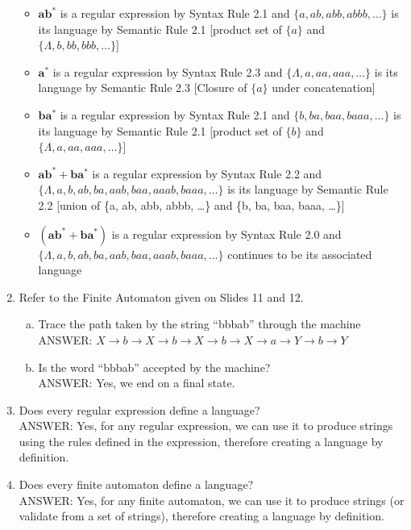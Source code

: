 \documentclass{article}
\begin{document}
\begin{enumerate}[1.]
\begin{itemize}
            \item $\bm{ab^*}$ is a regular expression by Syntax Rule 2.1 and
                $\{a, ab, abb, abbb, \dots\}$ is its language by Semantic Rule
                2.1 [product set of $\{a\}$ and $\{\Lambda, b, bb, bbb,
                \dots\}$]

            \item $\bm{a^*}$ is a regular expression by Syntax Rule 2.3 and
                $\{\Lambda, a, aa, aaa, \dots\}$ is its language by Semantic
                Rule 2.3 [Closure of $\{a\}$ under concatenation]

            \item $\bm{ba^*}$ is a regular expression by Syntax Rule 2.1 and
                $\{b, ba, baa, baaa, \dots\}$ is its language by Semantic Rule
                2.1 [product set of $\{b\}$ and $\{\Lambda, a, aa, aaa,
                \dots\}$]

            \item $\bm{ab^* + ba^*}$ is a regular expression by Syntax Rule 2.2 and
                $\{\Lambda, a, b, ab, ba, aab, baa, aaab, baaa, \dots\}$ is its language by Semantic Rule
                2.2 [union of \{a, ab, abb, abbb, \dots\} and \{b, ba, baa, baaa, \dots\}]

            \item $\bm{(ab^* + ba^*)}$ is a regular expression by Syntax Rule
                2.0 and $\{\Lambda, a, b, ab, ba, aab, baa, aaab, baaa, \dots\}$
                continues to be its associated language
        \end{itemize}

    \item Refer to the Finite Automaton given on Slides 11 and 12.
        \begin{enumerate}[a)]
            \item Trace the path taken by the string ``bbbab'' through the
                machine \\
                ANSWER: $X \to b \to X \to b \to X \to b \to X \to a \to Y \to b \to Y$
            \item Is the word ``bbbab'' accepted by the machine? \\
                ANSWER: Yes, we end on a final state.
        \end{enumerate}

    \item Does every regular expression define a language? \\
        ANSWER: Yes, for any regular expression, we can use it to produce
        strings using the rules defined in the expression, therefore creating a
        language by definition.
    \item Does every finite automaton define a language? \\
        ANSWER: Yes, for any finite automaton, we can use it to produce strings
        (or validate from a set of strings), therefore creating a
        language by definition.


\end{enumerate}
\end{document}

